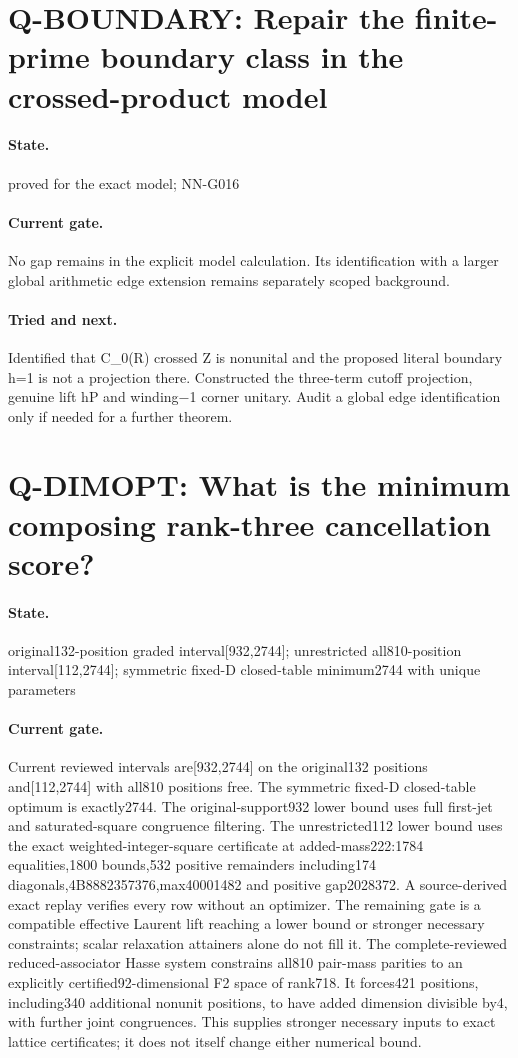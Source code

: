 \section{Q-BOUNDARY: Repair the finite-prime boundary class in the crossed-product model}
\paragraph{State.} proved for the exact model; NN-G016
\paragraph{Current gate.} No gap remains in the explicit model calculation. Its identification with a larger global arithmetic edge extension remains separately scoped background.
\paragraph{Tried and next.} Identified that C\_0(R) crossed Z is nonunital and the proposed literal boundary h=1 is not a projection there. Constructed the three-term cutoff projection, genuine lift hP and winding−1 corner unitary. Audit a global edge identification only if needed for a further theorem.

\section{Q-DIMOPT: What is the minimum composing rank-three cancellation score?}
\paragraph{State.} original132-position graded interval[932,2744]; unrestricted all810-position interval[112,2744]; symmetric fixed-D closed-table minimum2744 with unique parameters
\paragraph{Current gate.} Current reviewed intervals are[932,2744] on the original132 positions and[112,2744] with all810 positions free. The symmetric fixed-D closed-table optimum is exactly2744. The original-support932 lower bound uses full first-jet and saturated-square congruence filtering. The unrestricted112 lower bound uses the exact weighted-integer-square certificate at added-mass222:1784 equalities,1800 bounds,532 positive remainders including174 diagonals,4B8882357376,max40001482 and positive gap2028372. A source-derived exact replay verifies every row without an optimizer. The remaining gate is a compatible effective Laurent lift reaching a lower bound or stronger necessary constraints; scalar relaxation attainers alone do not fill it. The complete-reviewed reduced-associator Hasse system constrains all810 pair-mass parities to an explicitly certified92-dimensional F2 space of rank718. It forces421 positions, including340 additional nonunit positions, to have added dimension divisible by4, with further joint congruences. This supplies stronger necessary inputs to exact lattice certificates; it does not itself change either numerical bound.
